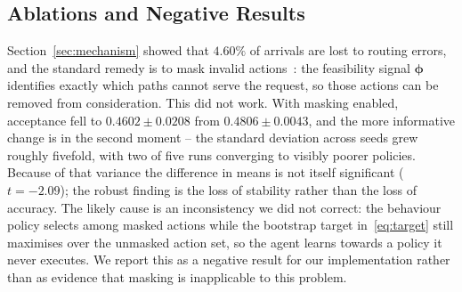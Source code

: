 \documentclass[10pt,journal,comsoc]{IEEEtran}
\begin{document}
\subsection{Ablations and Negative Results}
\label{sec:ablations}
Section~\ref{sec:mechanism} showed that $4.60\%$ of arrivals are lost to
routing errors, and the standard remedy is to mask invalid
actions~\cite{huang2022invalid}: the feasibility signal $\boldsymbol{\phi}$
identifies exactly which paths cannot serve the request, so those actions
can be removed from consideration. This did not work. With masking
enabled, acceptance fell to $0.4602 \pm 0.0208$ from $0.4806 \pm 0.0043$,
and the more informative change is in the second moment -- the standard
deviation across seeds grew roughly fivefold, with two of five runs
converging to visibly poorer policies. Because of that variance the
difference in means is not itself significant ($t=-2.09$); the robust
finding is the loss of stability rather than the loss of accuracy. The
likely cause is an inconsistency we did not correct: the behaviour policy
selects among masked actions while the bootstrap target
in~\eqref{eq:target} still maximises over the unmasked action set, so the
agent learns towards a policy it never executes. We report this as a
negative result for our implementation rather than as evidence that
masking is inapplicable to this problem.
\end{document}
